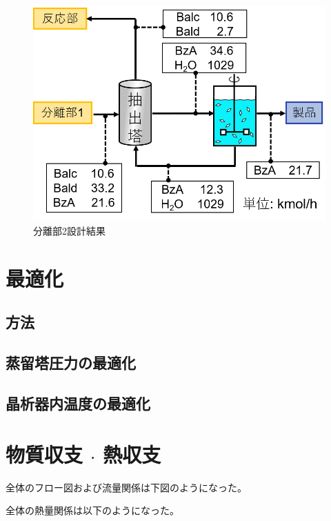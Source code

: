 \documentclass[a4j]{jsreport}
\begin{document}
\begin{figure}[h]
    \begin{center}
        \includegraphics[scale=0.7]{Separion2Conclusion.png}
        \caption{分離部2設計結果}
        \label{分離部2設計結果}
    \end{center}
\end{figure}

\newpage
\chapter{最適化}
\section{方法}

\section{蒸留塔圧力の最適化}

\section{晶析器内温度の最適化}

\newpage
\chapter{物質収支 $\cdot$ 熱収支}
全体のフロー図および流量関係は下図のようになった。

全体の熱量関係は以下のようになった。

\newpage
\end{document}
